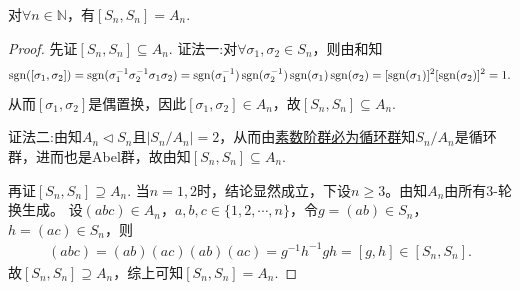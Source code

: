 \documentclass[../../main.tex]{subfiles}%
\begin{document}
\begin{proposition}\label{proposition:SnSn=An}
对$\forall n\in \mathbb{N}$，有$[S_n,S_n] = A_n$.
\end{proposition}
\begin{proof}

先证$[S_n,S_n] \subseteq A_n$.
{\color{blue}证法一:}对$\forall \sigma_1,\sigma_2\in S_n$，则由和知
\begin{align*}
\operatorname{sgn}([\sigma_1,\sigma_2]) = \operatorname{sgn}(\sigma_1^{-1}\sigma_2^{-1}\sigma_1\sigma_2) = \operatorname{sgn}(\sigma_1^{-1})\operatorname{sgn}(\sigma_2^{-1})\operatorname{sgn}(\sigma_1)\operatorname{sgn}(\sigma_2) = [\operatorname{sgn}(\sigma_1)]^2[\operatorname{sgn}(\sigma_2)]^2 = 1.
\end{align*}
从而$[\sigma_1,\sigma_2]$是偶置换，因此$[\sigma_1,\sigma_2]\in A_n$，故$[S_n,S_n] \subseteq A_n$.

{\color{blue}证法二:}由知$A_n\lhd S_n$且$|S_n/A_n|=2$，从而由\hyperref[proposition:素数阶群必为循环群]{素数阶群必为循环群}知$S_n/A_n$是循环群，进而也是Abel群，故由知$[S_n,S_n] \subseteq A_n$.

再证$[S_n,S_n] \supseteq A_n$.
当$n=1,2$时，结论显然成立，下设$n\geqslant 3$。由知$A_n$由所有3-轮换生成。
设$(abc)\in A_n$，$a,b,c\in\{1,2,\cdots,n\}$，令$g=(ab)\in S_n$，$h=(ac)\in S_n$，则
\begin{align*}
(abc) = (ab)(ac)(ab)(ac) = g^{-1}h^{-1}gh = [g,h] \in [S_n,S_n].
\end{align*}
故$[S_n,S_n] \supseteq A_n$，综上可知$[S_n,S_n] = A_n$.

\end{proof}
\end{document}
